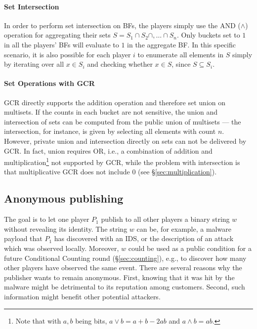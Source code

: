 \documentclass{sig-alternate}
\begin{document}
\paragraph{Set Intersection}
In order to perform set intersection on BFs, the players simply use the AND ($\wedge$) operation for aggregating their sets $S=S_1 \cap S_2 \cap, \ldots \cap S_n$.
Only buckets set to $1$ in all the players' BFs will evaluate to $1$ in the aggregate BF. In this specific scenario, it is also possible for each player $i$ to enumerate all elements in $S$ simply by iterating over all $x \in S_i$ and checking whether $x \in S$, since $S \subseteq S_i$.

\paragraph{Set Operations with GCR}
GCR directly supports the addition operation and therefore set union on multisets. If the counts in each bucket are not sensitive, the union and intersection of sets can be computed from the public union of multisets --- the intersection, for instance, is given by selecting all elements with count $n$. 
However, private union and intersection  directly on sets can not be delivered by GCR.
In fact, union requires OR, i.e., a combination of addition and multiplication\footnote{Note that with $a,b$ being bits, $a \vee b = a+b-2ab$ and $a \wedge b = ab$.} not supported by GCR, while the problem with intersection is that  multiplicative GCR does not include $0$ (see \S\ref{sec:multiplication}).  
 

\subsection{Anonymous publishing}\label{sec:publishing}

The goal is to let one player $P_1$ publish to all other players a binary string $w$ without revealing its identity. 
The string $w$ can be, for example, a malware payload that $P_1$ has discovered with an IDS, or the description of an attack which was observed locally.
Moreover, $w$ could be used as a public condition for a future Conditional Counting round  (\S \ref{sec:counting}), e.g., to discover how many other players have observed the same event.
There are several reasons why the publisher wants to remain anonymous.
First, knowing that it was hit by the malware might be detrimental to its reputation among customers.
Second, such information might benefit other potential attackers.
\end{document}
